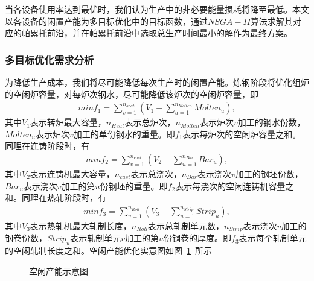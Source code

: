 \documentclass{whutmod}
\begin{document}
当各设备使用率达到最优时，我们认为生产中的非必要能量损耗将降至最低。本文以各设备的闲置产能为多目标优化中的目标函数，通过$NSGA-II$算法求解其对应的帕累托前沿，并在帕累托前沿中选取总生产时间最小的解作为最终方案。

\subsubsection{多目标优化需求分析}
为降低生产成本，我们将尽可能降低每次生产时的闲置产能。炼钢阶段将优化组炉的空闲炉容量，对每炉次钢水，尽可能降低该炉次的空闲炉容量，即
\begin{gather}
min	f_1=\sum_{v=1}^{n_{heat}}( V_1-\sum_{u=1}^{n_{Molten}} Molten_u),
\end{gather}
其中$V_1$表示转炉最大容量，$n_{Heat}$表示总炉次，$n_{Molten}$表示炉次$v$加工的钢水份数，$Molten_u$表示炉次$v$加工的单份钢水的重量。即$f_1$表示每炉次的空闲炉容量之和。同理在连铸阶段时，有
\begin{gather}
min	f_2=\sum_{v=1}^{n_{cast}}( V_2-\sum_{u=1}^{n_{Bar}} Bar_u),
\end{gather}
其中$V_2$表示连铸机最大容量，$n_{cast}$表示总浇次，$n_{Bar}$表示浇次$v$加工的钢坯份数，$Bar_u$表示浇次$v$加工的第$u$份钢坯的重量。即$f_2$表示每浇次的空闲连铸机容量之和。同理在热轧阶段时，有
\begin{gather}
min	f_3=\sum_{v=1}^{n_{Roll}}( V_3-\sum_{u=1}^{n_{Strip}} Strip_u),
\end{gather}
其中$V_3$表示热轧机最大轧制长度，$n_{Roll}$表示总轧制单元数，$n_{Strip}$表示浇次$v$加工的钢卷份数，$Strip_u$表示轧制单元$v$加工的第$u$份钢卷的厚度。即$f_3$表示每个轧制单元的空闲轧制长度之和。空闲产能优化实意图如图~\ref{xdffdx}~所示
\begin{figure}[H]
\centering
{}
\caption{空闲产能示意图}\label{xdffdx}
\end{figure}
\end{document}
